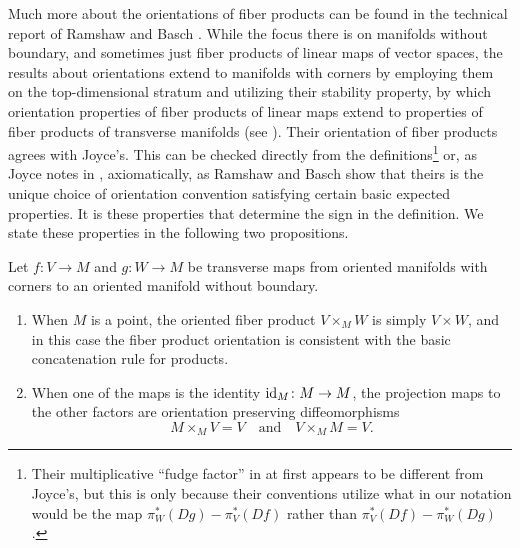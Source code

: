 Much more about the orientations of fiber products can be found in the technical report of Ramshaw and Basch \cite{RamBas09}.
While the focus there is on manifolds without boundary, and sometimes just fiber products of linear maps of vector spaces, the results about orientations extend to manifolds with corners by employing them on the top-dimensional stratum and utilizing their stability property, by which orientation properties of fiber products of linear maps extend to properties of fiber products of transverse manifolds (see \cite[Sections 6.3, 9.1.2, and 9.3]{RamBas09}).
Their orientation of fiber products agrees with Joyce's.
This can be checked directly from the definitions\footnote{Their multiplicative ``fudge factor'' in \cite[Theorem 9.14]{RamBas09} at first appears to be different from Joyce's, but this is only because their conventions utilize what in our notation would be the map $\pi_W^*(Dg)-\pi_V^*(Df)$ rather than $\pi_V^*(Df)-\pi_W^*(Dg)$.} or, as Joyce notes in \cite[Remark 7.6.iii]{Joy12}, axiomatically, as Ramshaw and Basch show that theirs is the unique choice of orientation convention satisfying certain basic expected properties.
It is these properties that determine the sign in the definition.
We state these properties in the following two propositions.

\begin{proposition}\label{P: oriented fiber product basic properties}
	Let $f \colon V \to M$ and $g \colon W \to M$ be transverse maps from oriented manifolds with corners to an oriented manifold without boundary.
	\begin{enumerate}
		\item When $M$ is a point, the oriented fiber product $V \times_M W$ is simply $V \times W$, and in this case the fiber product orientation is consistent with the basic concatenation rule for products.
		\item When one of the maps is the identity $\mathrm{id}_M \colon M \to M$, the projection maps to the other factors are orientation preserving diffeomorphisms
		\begin{equation*}
			M \times_M V = V\quad\text{and}\quad V \times_M M = V.
		\end{equation*}
	\end{enumerate}
\end{proposition}

